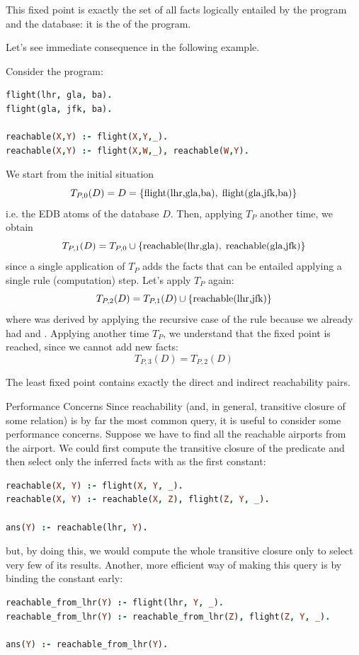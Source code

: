 This fixed point is exactly the set of all facts logically entailed by the program and the database: it is the  of the program.

Let's see immediate consequence  in the following example.

\begin{example}{}
    Consider the program:
    \begin{lstlisting}[language=prolog]
flight(lhr, gla, ba).
flight(gla, jfk, ba).

reachable(X,Y) :- flight(X,Y,_).
reachable(X,Y) :- flight(X,W,_), reachable(W,Y).
    \end{lstlisting}

    We start from the initial situation 
    \[T_{P,0}(D) = D = \set{\text{flight(lhr,gla,ba)},\; \text{flight(gla,jfk,ba)}}\]
    i.e. the EDB atoms of the database \(D\).
    Then, applying \(T_P\) another time, we obtain 
    \[T_{P,1}(D) = T_{P,0} \cup \set{\text{reachable(lhr,gla)},\; \text{reachable(gla,jfk)}}\]
    since a single application of \(T_P\) adds the facts that can be entailed applying a single rule (computation) step. 
    Let's apply \(T_P\) again:
    \[T_{P,2}(D) = T_{P,1}(D) \cup \set{\text{reachable(lhr,jfk)}}\]
    where  was derived by applying the recursive case of the  rule because we already had  and .
    Applying another time \(T_P\), we understand that the fixed point is reached, since we cannot add new facts:
    \[T_{P,3}(D) = T_{P,2}(D)\]

    The least fixed point contains exactly the direct and indirect reachability pairs.
\end{example}

\begin{example}{Performance Concerns}
    Since reachability (and, in general, transitive closure of some relation) is by far the most common query, it is useful to consider some performance concerns.
    Suppose we have to find all the reachable airports from the  airport.
    We could first compute the transitive closure of the  predicate and then select only the inferred  facts with  as the first constant:
    \begin{lstlisting}[language=prolog]
reachable(X, Y) :- flight(X, Y, _).
reachable(X, Y) :- reachable(X, Z), flight(Z, Y, _).

ans(Y) :- reachable(lhr, Y).
    \end{lstlisting}
    but, by doing this, we would compute the whole transitive closure only to select very few of its results.
    Another, more efficient way of making this query is by binding the constant early:
    \begin{lstlisting}[language=prolog]
reachable_from_lhr(Y) :- flight(lhr, Y, _).
reachable_from_lhr(Y) :- reachable_from_lhr(Z), flight(Z, Y, _).

ans(Y) :- reachable_from_lhr(Y).
    \end{lstlisting}
\end{example}

